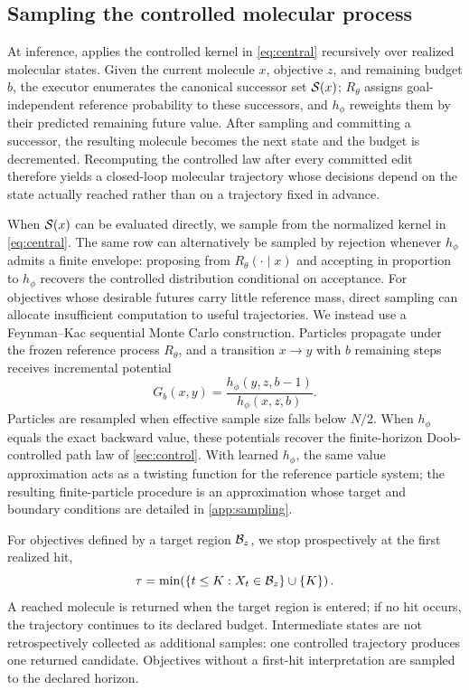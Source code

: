 \subsection{Sampling the controlled molecular process}
\label{sec:sampling}

At inference, \method{} applies the controlled kernel in \cref{eq:central} recursively over realized molecular states. Given the current molecule $x$, objective $z$, and remaining budget $b$, the executor enumerates the canonical successor set $\mathcal{S}(x)$; $R_\theta$ assigns goal-independent reference probability to these successors, and $h_\phi$ reweights them by their predicted remaining future value. After sampling and committing a successor, the resulting molecule becomes the next state and the budget is decremented. Recomputing the controlled law after every committed edit therefore yields a closed-loop molecular trajectory whose decisions depend on the state actually reached rather than on a trajectory fixed in advance.

When $\mathcal{S}(x)$ can be evaluated directly, we sample from the normalized kernel in \cref{eq:central}. The same row can alternatively be sampled by rejection whenever $h_\phi$ admits a finite envelope: proposing from $R_\theta(\cdot\mid x)$ and accepting in proportion to $h_\phi$ recovers the controlled distribution conditional on acceptance. For objectives whose desirable futures carry little reference mass, direct sampling can allocate insufficient computation to useful trajectories. We instead use a Feynman--Kac sequential Monte Carlo construction. Particles propagate under the frozen reference process $R_\theta$, and a transition $x\to y$ with $b$ remaining steps receives incremental potential
\begin{equation}
G_b(x,y)=\frac{h_\phi(y,z,b-1)}{h_\phi(x,z,b)}.
\label{eq:fk}
\end{equation}
Particles are resampled when effective sample size falls below $N/2$. When $h_\phi$ equals the exact backward value, these potentials recover the finite-horizon Doob-controlled path law of \cref{sec:control}. With learned $h_\phi$, the same value approximation acts as a twisting function for the reference particle system; the resulting finite-particle procedure is an approximation whose target and boundary conditions are detailed in \cref{app:sampling}.

For objectives defined by a target region $\mathcal{B}_z$, we stop prospectively at the first realized hit,
\begin{equation}
\tau=\min\!\left(\{t\le K:X_t\in\mathcal{B}_z\}\cup\{K\}\right).
\label{eq:stop}
\end{equation}
A reached molecule is returned when the target region is entered; if no hit occurs, the trajectory continues to its declared budget. Intermediate states are not retrospectively collected as additional samples: one controlled trajectory produces one returned candidate. Objectives without a first-hit interpretation are sampled to the declared horizon.


